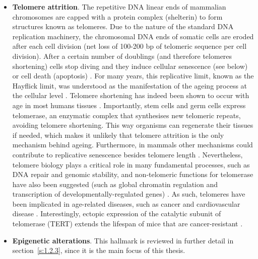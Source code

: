 \begin{itemize}
	\item \textbf{Telomere attrition}. The repetitive DNA linear ends of mammalian chromosomes are capped with a protein complex (shelterin) to form structures known as telomeres. Due to the nature of the standard DNA replication machinery, the chromosomal DNA ends of somatic cells are eroded after each cell division (net loss of 100-200 bp of telomeric sequence per cell division). After a certain number of doublings (and therefore telomeres shortening) cells stop diving and they induce cellular senescence (see below) or cell death (apoptosis) \cite{OSullivan2010}. For many years, this replicative limit, known as the Hayflick limit, was understood as the manifestation of the ageing process at the cellular level \cite{Hayflick1961,Hayflick1998}. Telomere shortening has indeed been shown to occur with age in most humans tissues \cite{Blasco2007}. Importantly, stem cells and germ cells express telomerase, an enzymatic complex that synthesises new telomeric repeats, avoiding telomere shortening. This way organisms can regenerate their tissues if needed, which makes it unlikely that telomere attrition is the only mechanism behind ageing. Furthermore, in mammals other mechanisms could contribute to replicative senescence besides telomere length \cite{OSullivan2010}. Nevertheless, telomere biology plays a critical role in many fundamental processes, such as DNA repair and genomic stability, and non-telomeric functions for telomerase have also been suggested (such as global chromatin regulation and transcription of developmentally-regulated genes) \cite{OSullivan2010}. As such, telomeres have been implicated in age-related diseases, such as cancer and cardiovascular disease \cite{OSullivan2010,Blasco2007}. Interestingly, ectopic expression of the catalytic subunit of telomerase (TERT) extends the lifespan of mice that are cancer-resistant \cite{Tomas-Loba2008}. 
	
	\item \textbf{Epigenetic alterations}. This hallmark is reviewed in further detail in section~\ref{s:1.2.3}, since it is the main focus of this thesis.
	

\end{itemize}
